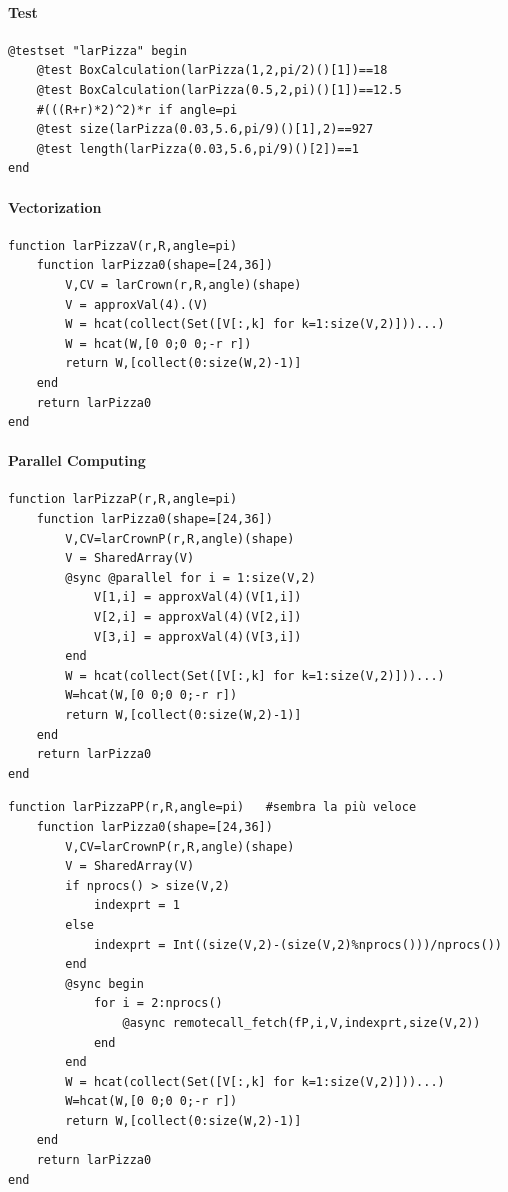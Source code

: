 \documentclass{article}
\begin{document}
\paragraph{Test}
\begin{Verbatim}
@testset "larPizza" begin
	@test BoxCalculation(larPizza(1,2,pi/2)()[1])==18
	@test BoxCalculation(larPizza(0.5,2,pi)()[1])==12.5
	#(((R+r)*2)^2)*r if angle=pi
	@test size(larPizza(0.03,5.6,pi/9)()[1],2)==927
	@test length(larPizza(0.03,5.6,pi/9)()[2])==1
end
\end{Verbatim}

\paragraph{Vectorization\\}
\begin{Verbatim}
function larPizzaV(r,R,angle=pi)
    function larPizza0(shape=[24,36])
        V,CV = larCrown(r,R,angle)(shape)
        V = approxVal(4).(V)
        W = hcat(collect(Set([V[:,k] for k=1:size(V,2)]))...)
        W = hcat(W,[0 0;0 0;-r r])
        return W,[collect(0:size(W,2)-1)]
    end
    return larPizza0
end
\end{Verbatim}

\paragraph{Parallel Computing\\}

\begin{Verbatim}
function larPizzaP(r,R,angle=pi)
    function larPizza0(shape=[24,36])
        V,CV=larCrownP(r,R,angle)(shape)
        V = SharedArray(V)
        @sync @parallel for i = 1:size(V,2)
            V[1,i] = approxVal(4)(V[1,i])
            V[2,i] = approxVal(4)(V[2,i])
            V[3,i] = approxVal(4)(V[3,i])
        end
        W = hcat(collect(Set([V[:,k] for k=1:size(V,2)]))...)
        W=hcat(W,[0 0;0 0;-r r])
        return W,[collect(0:size(W,2)-1)]
    end
    return larPizza0
end
\end{Verbatim}

\begin{Verbatim}
function larPizzaPP(r,R,angle=pi)   #sembra la più veloce
    function larPizza0(shape=[24,36])
        V,CV=larCrownP(r,R,angle)(shape)
        V = SharedArray(V)
        if nprocs() > size(V,2)
            indexprt = 1
        else
            indexprt = Int((size(V,2)-(size(V,2)%nprocs()))/nprocs())
        end
        @sync begin
            for i = 2:nprocs()
                @async remotecall_fetch(fP,i,V,indexprt,size(V,2))
            end
        end
        W = hcat(collect(Set([V[:,k] for k=1:size(V,2)]))...)
        W=hcat(W,[0 0;0 0;-r r])
        return W,[collect(0:size(W,2)-1)]
    end
    return larPizza0
end
\end{Verbatim}
\end{document}
